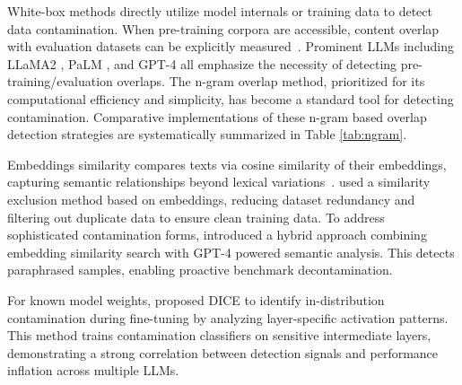 White-box methods directly utilize model internals or training data to detect data contamination. When pre-training corpora are accessible, content overlap with evaluation datasets can be explicitly measured~\cite{elangovan-etal-2021-memorization}. Prominent LLMs including LLaMA2 \cite{touvron2023llama2}, PaLM \cite{chowdhery2023palm}, and GPT-4 \cite{achiam2023gpt} all emphasize the necessity of detecting pre-training/evaluation overlaps. The n-gram overlap method, prioritized for its computational efficiency and simplicity, has become a standard tool for detecting contamination. Comparative implementations of these n-gram based overlap detection strategies are systematically summarized in Table \ref{tab:ngram}.

Embeddings similarity compares texts via cosine similarity of their embeddings, capturing semantic relationships beyond lexical variations~\cite{reimers2019sentence}. \citet{lee2023platypus} used a similarity exclusion method based on embeddings, reducing dataset redundancy and filtering out duplicate data to ensure clean training data. To address sophisticated contamination forms, \cite{yang2023rethinkingbenchmarkcontaminationlanguage} introduced a hybrid approach combining embedding similarity search with GPT-4 powered semantic analysis. This detects paraphrased samples, enabling proactive benchmark decontamination.

For known model weights,
\citet{tu2024dicedetectingindistributioncontamination} proposed DICE to identify in-distribution contamination during fine-tuning by analyzing layer-specific activation patterns. This method trains contamination classifiers on sensitive intermediate layers, demonstrating a strong correlation between detection signals and performance inflation across multiple LLMs.


